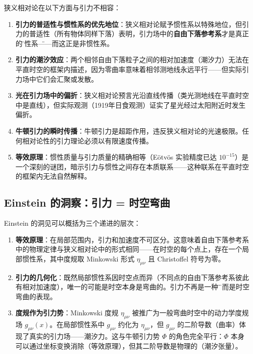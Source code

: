 \begin{remark}[狭义相对论为何不能描述引力]
狭义相对论在以下方面与引力不相容：
\begin{enumerate}
    \item \textbf{引力的普适性与惯性系的优先地位}：狭义相对论赋予惯性系以特殊地位，但引力的普适性（所有物体同样下落）表明，引力场中的\textbf{自由下落参考系}才是真正的\"惯性系\"——而这正是非惯性系。
    \item \textbf{引力的潮汐效应}：两个相邻自由下落粒子之间的相对加速度（潮汐力）无法在平直时空的框架内描述，因为零曲率意味着相邻测地线永远平行——但实际引力场中它们会汇聚或发散。
    \item \textbf{光在引力场中的偏折}：狭义相对论预言光沿直线传播（类光测地线在平直时空中是直线），但实际观测（1919年日食观测）证实了星光经过太阳附近时发生偏折。
    \item \textbf{牛顿引力的瞬时传播}：牛顿引力是超距作用，违反狭义相对论的光速极限。任何相对论性的引力理论必须以有限速度传播。
    \item \textbf{等效原理}：惯性质量与引力质量的精确相等（Eötvös 实验精度已达 $10^{-15}$）是一个深刻的谜团，暗示引力与惯性之间存在本质联系——这种联系在平直时空的框架内无法自然解释。
\end{enumerate}
\end{remark}

\subsection{Einstein 的洞察：引力 = 时空弯曲}

\begin{note}[从平直时空到弯曲时空的关键跃迁]
Einstein 的洞见可以概括为三个递进的层次：
\begin{enumerate}
    \item \textbf{等效原理}：在局部范围内，引力和加速度不可区分。这意味着自由下落参考系中的物理定律与狭义相对论中的形式相同——在时空的每个点上，存在一个局部惯性系，其中度规取 Minkowski 形式 $\eta_{\mu\nu}$ 且 Christoffel 符号为零。
    \item \textbf{引力的几何化}：既然局部惯性系因时空点而异（不同点的自由下落参考系彼此有相对加速度），唯一的可能是时空本身是弯曲的。引力不再是一种\"力\"，而是时空弯曲的表现。
    \item \textbf{度规作为引力势}：Minkowski 度规 $\eta_{\mu\nu}$ 被推广为一般弯曲时空中的动力学度规场 $g_{\mu\nu}(x)$。在局部惯性系中 $g_{\mu\nu}$ 约化为 $\eta_{\mu\nu}$，但 $g_{\mu\nu}$ 的二阶导数（曲率）体现了真实的引力场——潮汐力。这与牛顿引力势 $\Phi$ 的角色完全平行：$\Phi$ 本身可以通过坐标变换消除（等效原理），但其二阶导数是物理的（潮汐张量）。
\end{enumerate}
\end{note}

